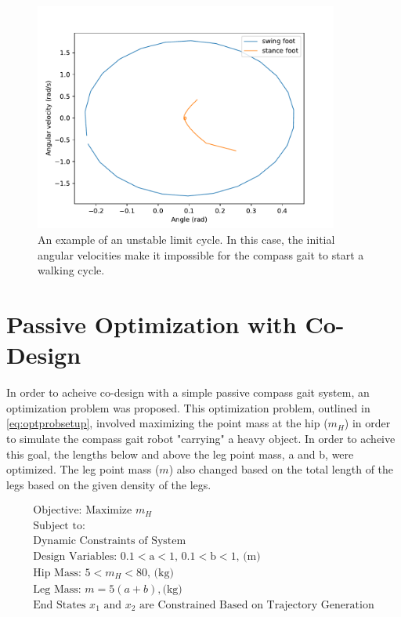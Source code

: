 \documentclass{./springer/svjour3}
\begin{document}
\begin{figure}[!h]
\centering
\includegraphics[width=10cm]{./figures/unstable_onecycle.pdf}
\caption{An example of an unstable limit cycle. In this case, the initial angular velocities make it impossible for the compass gait to start a walking cycle.}
\label{fig:unstable_onecycle}
\end{figure}

\clearpage

\section{Passive Optimization with Co-Design}

In order to acheive co-design with a simple passive compass gait system, an optimization problem was proposed.
This optimization problem, outlined in  \ref{eq:optprobsetup}, involved maximizing the point mass at the hip ($m_H$) in order to simulate the
compass gait robot "carrying" a heavy object. In order to acheive this goal, the lengths below and above the leg point mass, a and b, were optimized.
The leg point mass ($m$) also changed based on the total length of the legs based on the given density of the legs.

\begin{equation}
\begin{aligned}
\text{Objective: Maximize $m_H$}\\
\text{Subject to:}\\
\text{Dynamic Constraints of System}\\
\text{Design Variables: 0.1$<$a$<$1, 0.1$<$b$<$1, (m)}\\
\text{Hip Mass: 5$<$$m_H$$<$80, (kg)}\\
\text{Leg Mass: } m = 5(a+b), \text{(kg)}\\
\text{End States $x_1$ and $x_2$ are Constrained Based on Trajectory Generation}
\end{aligned}
\label{eq:optprobsetup}
\end{equation}
\end{document}
